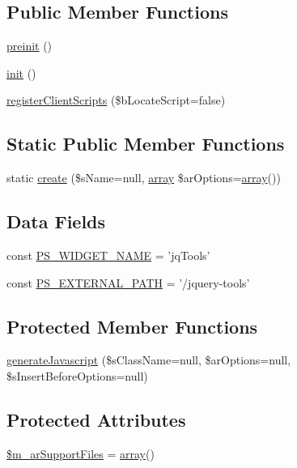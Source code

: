 \subsection*{Public Member Functions}
\begin{DoxyCompactItemize}
\item 
\hyperlink{classCPSjqToolsWrapper_a2dc262e99b1c246b56f27626bfe699ff}{preinit} ()
\item 
\hyperlink{classCPSjqToolsWrapper_a4be4055f3361d4800e16bc2e2e38cda6}{init} ()
\item 
\hyperlink{classCPSjqToolsWrapper_ac02a66bde8e72e4909137bf748edf665}{registerClientScripts} (\$bLocateScript=false)
\end{DoxyCompactItemize}
\subsection*{Static Public Member Functions}
\begin{DoxyCompactItemize}
\item 
static \hyperlink{classCPSjqToolsWrapper_a0ffc269a208148ade57c7eb608a4562a}{create} (\$sName=null, \hyperlink{list_8php_aa3205d038c7f8feb5c9f01ac4dfadc88}{array} \$arOptions=\hyperlink{list_8php_aa3205d038c7f8feb5c9f01ac4dfadc88}{array}())
\end{DoxyCompactItemize}
\subsection*{Data Fields}
\begin{DoxyCompactItemize}
\item 
const \hyperlink{classCPSjqToolsWrapper_ae357f9dc377f7de0d12010b2ced28cbc}{PS\_\-WIDGET\_\-NAME} = 'jqTools'
\item 
const \hyperlink{classCPSjqToolsWrapper_a8ccb5e1d65c091f944a6aa8c5be834ca}{PS\_\-EXTERNAL\_\-PATH} = '/jquery-\/tools'
\end{DoxyCompactItemize}
\subsection*{Protected Member Functions}
\begin{DoxyCompactItemize}
\item 
\hyperlink{classCPSjqToolsWrapper_a554bd0c9d85647b30594e66bf7575646}{generateJavascript} (\$sClassName=null, \$arOptions=null, \$sInsertBeforeOptions=null)
\end{DoxyCompactItemize}
\subsection*{Protected Attributes}
\begin{DoxyCompactItemize}
\item 
\hyperlink{classCPSjqToolsWrapper_a9c534841f3f306a177d9be4a425c9e04}{\$m\_\-arSupportFiles} = \hyperlink{list_8php_aa3205d038c7f8feb5c9f01ac4dfadc88}{array}()
\end{DoxyCompactItemize}


